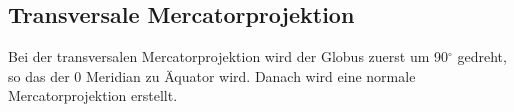 \subsection{Transversale Mercatorprojektion}
\label{sec:transmercator}
Bei der transversalen  Mercatorprojektion wird der Globus zuerst um 90$ ^\circ $ gedreht, so das der 0 Meridian zu Äquator wird. Danach wird eine normale Mercatorprojektion erstellt.